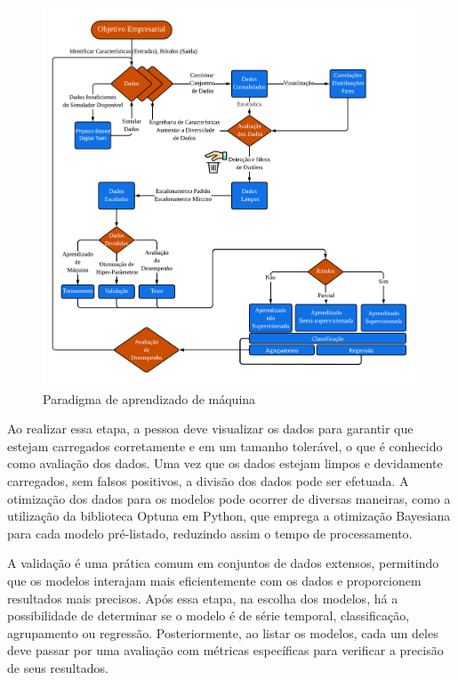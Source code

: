 \begin{figure}[!htb]
	\centering
	\caption{Paradigma de aprendizado de máquina}
	\includegraphics[width=\linewidth]{Introducao/Figuras/paradigma-ml}
	
	\label{fig:paradigma-ml}
\end{figure}

Ao realizar essa etapa, a pessoa deve visualizar os dados para garantir que estejam carregados corretamente e em um tamanho tolerável, o que é conhecido como avaliação dos dados. Uma vez que os dados estejam limpos e devidamente carregados, sem falsos positivos, a divisão dos dados pode ser efetuada.
A otimização dos dados para os modelos pode ocorrer de diversas maneiras, como a utilização da biblioteca Optuna em Python, que emprega a otimização Bayesiana para cada modelo pré-listado, reduzindo assim o tempo de processamento.

A validação é uma prática comum em conjuntos de dados extensos, permitindo que os modelos interajam mais eficientemente com os dados e proporcionem resultados mais precisos. Após essa etapa, na escolha dos modelos, há a possibilidade de determinar se o modelo é de série temporal, classificação, agrupamento ou regressão. Posteriormente, ao listar os modelos, cada um deles deve passar por uma avaliação com métricas específicas para verificar a precisão de seus resultados.

